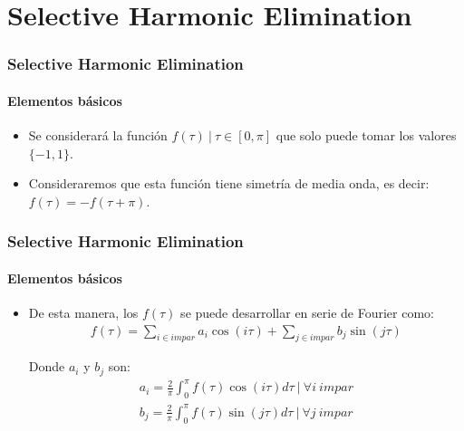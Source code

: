 

\section{Selective Harmonic Elimination}
\begin{frame}
    \frametitle{Selective Harmonic Elimination}
    \framesubtitle{Elementos básicos}
    \begin{itemize}
        \item     Se considerará la función $f(\tau) \ | \ \tau \in [0,\pi]$ que solo puede tomar los valores $\{-1,1\}$.
        \item Consideraremos que esta función tiene simetría de media onda, es decir: $f(\tau) = -f(\tau + \pi)$.
    \end{itemize}

\end{frame}
\begin{frame}
    \frametitle{Selective Harmonic Elimination}
    \framesubtitle{Elementos básicos}
    \begin{itemize}
        \item De esta manera, los $f(\tau)$ se puede desarrollar en serie de Fourier como:
    \begin{gather}
        f(\tau ) = \sum_{i \in impar} a_i \cos(i\tau)+ \sum_{j \in impar}  b_j \sin(j \tau) 
    \end{gather}
    
    Donde $a_i$ y $b_j$  son:
    \begin{gather}
        a_i = \frac{2}{\pi} \int_0^\pi f(\tau ) \cos(i \tau)d\tau \ | \ \forall i \ impar \label{an}\\
        b_j = \frac{2}{\pi} \int_0^\pi f(\tau)  \sin(j \tau) d\tau \ | \ \forall j \ impar \label{bn}
    \end{gather}
    \end{itemize}

\end{frame}
